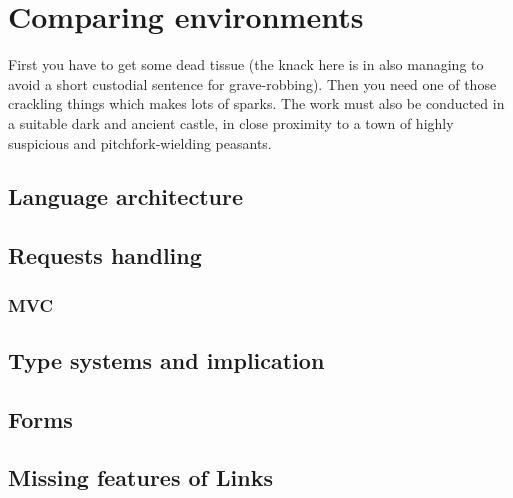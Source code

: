 
\chapter{Comparing environments}

First you have to get some dead tissue (the knack here is in also managing to
avoid a short custodial sentence for grave-robbing). Then you need one of
those crackling things which makes lots of sparks. The work must also be
conducted in a suitable dark and ancient castle, in close proximity to a town
of highly suspicious and pitchfork-wielding peasants.

\section{Language architecture}

\section{Requests handling}

\subsection{MVC}

\section{Type systems and implication}

\section{Forms}

\section{Missing features of Links}
